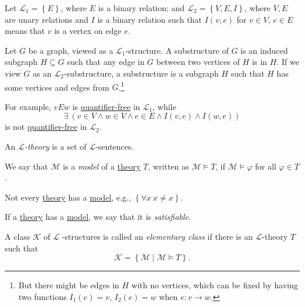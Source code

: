 \begin{eg}
	Let \(\mathcal{L} _1 = \left\{ E \right\} \), where \(E\) is a binary relation; and \(\mathcal{L} _2 = \left\{ V, E, I \right\} \), where \(V, E\) are unary relations and \(I\) is a binary relation such that \(I(v, e)\) for \(v\in V\), \(e\in E\) means that \(v\) is a vertex on edge \(e\).
\end{eg}

Let \(G\) be a graph, viewed as a \(\mathcal{L} _1\)-structure. A substructure of \(G\) is an induced subgraph \(H \subseteq G\) such that any edge in \(G\) between two vertices of \(H\) is in \(H\). If we view \(G\) as an \(\mathcal{L} _2\)-substructure, a substructure is a subgraph \(H\) such that \(H\) has some vertices and edges from \(G\).\footnote{But there might be edges in \(H\) with no vertices, which can be fixed by having two functions \(I_1(e)=v\), \(I_2(e)=w\) when \(e\colon v \to w\).}

For example, \(vEw\) is \hyperref[not:quantifier-free-formula]{quantifier-free} in \(\mathcal{L} _1\), while
\[
	\exists \ (v\in V \land w\in V \land e\in E \land I(v, e) \land I(w, e))
\]
is not \hyperref[not:quantifier-free-formula]{quantifier-free} in \(\mathcal{L} _2\).

\begin{definition}[Theory]\label{def:theory}
	An \emph{\(\mathcal{L}\)-theory} is a set of \(\mathcal{L} \)-sentences.
\end{definition}

\begin{definition}[Model]\label{def:model}
	We say that \(\mathcal{M} \) is a \emph{model} of a \hyperref[def:theory]{theory} \(T\), written as \(\mathcal{M} \models T\), if \(\mathcal{M} \models \varphi \) for all \(\varphi \in T\).
\end{definition}

\begin{note}
	Not every \hyperref[def:theory]{theory} has a \hyperref[def:model]{model}, e.g., \(\left\{ \forall x\ x \neq x \right\} \).
\end{note}

\begin{definition}[Satisfiable]\label{def:satisfiable}
	If a \hyperref[def:theory]{theory} has a \hyperref[def:model]{model}, we say that it is \emph{satisfiable}.
\end{definition}

\begin{definition}\label{def:elementary-class}
	A class \(\mathcal{K} \) of \(\mathcal{L} \) -structures is called an \emph{elementary class} if there is an \(\mathcal{L} \)-theory \(T\) such that
	\[
		\mathcal{K} = \left\{ \mathcal{M} \mid \mathcal{M} \models T \right\}.
	\]
\end{definition}


